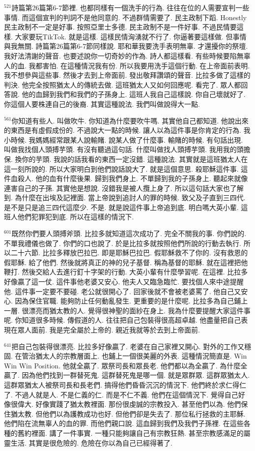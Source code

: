 \documentclass{book}
\begin{document}
$^{521}$詩篇第26篇第6-7節裡.
也都同樣有一個洗手的行為.
往往在位的人需要宣判一些事情.
而這個宣判的判詞不是他同意的.
不過群情需要了.
民主政制下蹈.
Honestly 民主政制不一定是好事.
按照亞里士多德.
民主政制不是一件好事.
不過民情要這樣.
大家要玩TikTok.
就是這樣.
這樣民情洶湧就不行了.
你逼著要這樣做.
但事情與我無關.
詩篇第26篇第6-7節同樣說.
耶和華我要洗手表明無辜.
才還擾你的祭壇.
我好法清謝的聲音.
也要述說你一切奇妙的作為.
詩人都這樣看.
有些時候要陷無辜人的血.
我都害怕.
在這種情況我有份.
所以我要用洗手這個行動.
在上帝面前表明.
我不想參與這些事.
然後才去到上帝面前.
發出敬拜讚頌的聲音.
比拉多做了這樣的判決.
他完全按照猶太人的傳統去做.
這班猶太人又如何回應呢.
看完了.
眾人都回答說.
他的血歸到我們和我們的子孫身上.
這班人我自己這樣說.
你自己壞就好了.
你這個人要株連自己的後裔.
其實這種說法.
我們叫做說得大一點.

$^{561}$你知道有些人.
叫做吹牛.
你知道為什麼要吹牛嗎.
其實他自己都知道.
他說出來的東西是有虛假成份的.
不過說大一點的時候.
讓人以為這件事是你肯定的行為.
我小時候.
我媽媽經常跟某人說輸賭.
說某人做了什麼事.
輸賭的時候.
有句話出現.
叫做我找個人頭搏芋頭.
有沒有聽過這句話.
什麼叫做找人頭搏芋頭.
我用我的頭擔保.
換你的芋頭.
我說的話我看的東西一定沒錯.
這種說法.
其實就是這班猶太人在這一刻所說的.
所以大家明白到他們說話說大了.
就是這個意思.
殺耶穌這件事.
這件血殺人.
他的血有什麼後果.
歸到我們身上.
不單歸到我的子孫身上.
聽起來就像連害自己的子孫.
其實他是想說.
沒錯我是被人攬上身了.
所以這句話大家也了解到.
為什麼在出埃及記裡面.
當上帝說到追討人的罪的時候.
致父及子直到三四代.
是不是只是追三四代這麼少.
不是.
就是說這件事上帝追到底.
明白嗎大英小輩.
這班人他們犯罪犯到底.
所以在這樣的情況下.

$^{601}$既然你們要人頭搏斧頭.
比拉多就知道這次成功了.
完全不關我的事.
你們說的.
不單我禮儀也做了.
你們的口也說了.
於是比拉多就按照他們所說的行動去執行.
所以二十六節.
比拉多釋放巴拉巴.
即是耶穌巴拉巴.
假耶穌救不了你的.
沒有救恩的假耶穌.
給了他們.
然後就將真正的神的兒子基督.
稱為基督的耶穌.
就在這裡把他鞭打.
然後交給人去進行釘十字架的行動.
大英小輩有什麼學習呢.
在這裡.
比拉多好像贏了這一仗.
這件事他老婆又安心.
他夫人又臨急臨忙.
要找個人來中途提醒他.
這件事一定要不要碰.
老公就很開心了.
回家後就不會被老婆罵了.
他自己又安心.
因為保住官職.
能夠防止任何動亂發生.
更重要的是什麼呢.
比拉多為自己鋪上一層.
很漂亮而猶太教的人.
覺得很神聖的面紗在身上.
我為什麼要提醒大家這件事呢.
你知道很多時候.
傳假道的人.
往往把自己包裝得很高超卓越.
他盡量把自己表現在眾人面前.
我是完全屬於上帝的.
親近我就等於去到上帝面前.

$^{641}$把自己包裝得很漂亮.
比拉多好像贏了.
老婆在自己家裡又開心.
對外的工作又穩固.
在管治猶太人的宗教層面上.
也鋪上一個很美麗的外表.
這種情況簡直是.
Win Win Win Position.
他就全贏了.
眾祭司長和眾長老.
他們都以為全贏了.
為什麼全贏了.
因為他們找到一群替死鬼.
這群替死鬼是哪一個.
就是眾群眾.
這群眾猶太人.
這群眾猶太人被祭司長和長老們.
搞得他們昏昏沉沉的情況下.
他們終於求仁得仁了.
不過人就是人.
不是仁義的仁.
而是不仁不義.
他們在這個情況下.
覺得自己好像很偉大.
好像實踐了猶太教裡面.
那份很虔誠的宗教投入.
甚至他們以為.
他們保住猶太教.
但他們以為護教成功也好.
但他們卻是失去了.
那位私行拯救的主耶穌.
他們陷在流無辜人的血的罪.
而他們親口說.
這血歸到我們及我們子孫裡.
在這些各種的舊約裡面.
講了一件事實.
一種只能夠讓自己有宗教狂熱.
甚至宗教感滿足的屬靈生活.
其實是很危險的.
危險在你以為自己已經得著了.
\end{document}
